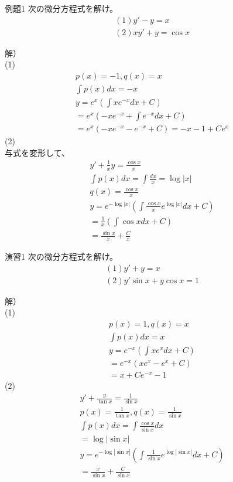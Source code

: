 \documentclass{jsarticle}
\begin{document}
\begin{itembox}[l]{例題1}
次の微分方程式を解け。
\begin{eqnarray}
(1)y'-y=x\\
(2)xy'+y=\cos x
\end{eqnarray}
\end{itembox}
解）\\
(1)
\begin{eqnarray}
p(x)=-1,q(x)=x\\
\int p(x)dx =-x\\
y=e^x\left(\int xe^{-x}dx+C\right)\\
=e^x\left(-xe^{-x}+\int e^{-x}dx+C\right)\\
=e^x(-xe^{-x}-e^{-x}+C)
=-x-1+Ce^x
\end{eqnarray}
(2)\\
与式を変形して、
\begin{eqnarray}
y'+\frac{1}{x}y=\frac{\cos x}{x}\\
\int p(x)dx=\int \frac{dx}{x} =\log|x|\\
q(x)=\frac{\cos x}{x}\\
y=e^{-\log |x|}\left(\int \frac{\cos x}{x}e^{\log|x|}dx+C\right)\\
=\frac{1}{x}\left(\int \cos xdx+C\right)\\
=\frac{\sin x}{x}+\frac{C}{x}
\end{eqnarray}
\begin{itembox}[l]{演習1}
次の微分方程式を解け。
\begin{eqnarray}
(1)y'+y=x\\
(2)y'\sin x+y\cos x =1
\end{eqnarray}
\end{itembox}
解）\\
(1)
\begin{eqnarray}
p(x)=1,q(x)=x\\
\int p(x)dx= x\\
y=e^{-x}\left(\int xe^xdx+C\right)\\
=e^{-x}(xe^x-e^x+C)\\
=x+Ce^{-x}-1
\end{eqnarray}
(2)
\begin{eqnarray}
y'+\frac{y}{\tan x}=\frac{1}{\sin x}\\
p(x)=\frac{1}{\tan x},q(x)=\frac{1}{\sin x}\\
\int p(x)dx =\int \frac{\cos x}{\sin x}dx\\
=\log |\sin x|\\
y=e^{-\log|\sin x|}\left(\int \frac{1}{\sin x}e^{\log |\sin x|}dx+C\right)\\
=\frac{x}{\sin x}+\frac{C}{\sin x}
\end{eqnarray}
\end{document}

